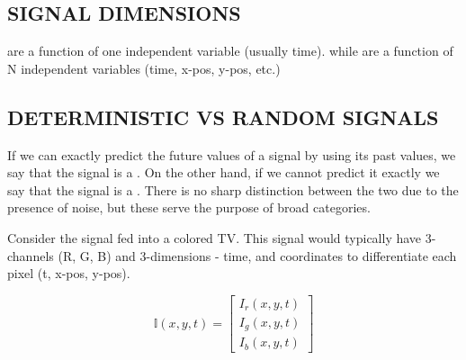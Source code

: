 \documentclass[]{report}
\newcommand{\keyword}[1]{{{\color{green}{#1}}}}
\begin{document}
\subsection*{SIGNAL DIMENSIONS}

\keyword{One-dimensional signals} are a function of one independent variable (usually time). while \keyword{N-dimensional signals} are a function of N independent variables (time, x-pos, y-pos, etc.)

\subsection*{DETERMINISTIC VS RANDOM SIGNALS}

If we can exactly predict the future values of a signal by using its past values, we say that the signal is a \keyword{deterministic signal}. On the other hand, if we cannot predict it exactly we say that the signal is a \keyword{random signal}. There is no sharp distinction between the two due to the presence of noise, but these serve the purpose of broad categories.

\begin{highlight}
	Consider the signal fed into a colored TV. This signal would typically have 3-channels (R, G, B) and 3-dimensions - time, and coordinates to differentiate each pixel (t, x-pos, y-pos).
	
	\[ \mathbb{I}\left( x,y,t \right) = \begin{bmatrix}
		I_r\left(x,y,t\right) \\ I_g\left(x,y,t\right) \\ I_b\left(x,y,t\right)
	\end{bmatrix}	\]
	
\end{highlight}
\end{document}
